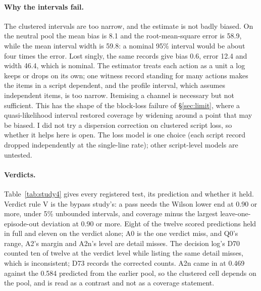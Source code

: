 \documentclass[11pt]{article}
\begin{document}
\paragraph{Why the intervals fail.} The clustered intervals are too narrow, and the
estimate is not badly biased. On the neutral pool the mean bias is 8.1 and the
root-mean-square error is 58.9, while the mean interval width is 59.8: a nominal 95\%
interval would be about four times the error. Lost singly, the same records give bias 0.6,
error 12.4 and width 46.4, which is nominal. The estimator treats each action as a unit a log
keeps or drops on its own; one witness record standing for many actions makes the items in a
script dependent, and the profile interval, which assumes independent items, is too narrow.
Itemising a channel is necessary but not sufficient. This has the shape of the block-loss
failure of \S\ref{sec:limit}, where a quasi-likelihood interval restored coverage by
widening around a point that may be biased. I did not try a dispersion correction on
clustered script loss, so whether it helps here is open. The loss model is one choice (each
script record dropped independently at the single-line rate); other script-level models are
untested.

\begin{table}[h]
\centering\small

\caption{Study 4, \texttt{ll\_bic} coverage by what the auditor has and how a script's
records are lost.}
\label{tab:study4clustered}
\end{table}

\paragraph{Verdicts.} Table~\ref{tab:study4} gives every registered test, its prediction
and whether it held. Verdict rule V is the bypass study's: a pass needs the Wilson lower end
at 0.90 or more, under 5\% unbounded intervals, and coverage minus the largest
leave-one-episode-out deviation at 0.90 or more. Eight of the twelve scored predictions held
in full and eleven on the verdict alone; A0 is the one verdict miss, and Q0's range, A2's
margin and A2n's level are detail misses. The decision log's D70 counted ten of twelve at
the verdict level while listing the same detail misses, which is inconsistent; D73 records
the corrected counts. A2n came in at 0.469 against the 0.584 predicted from the earlier pool,
so the clustered cell depends on the pool, and is read as a contrast and not as a coverage
statement.
\end{document}
